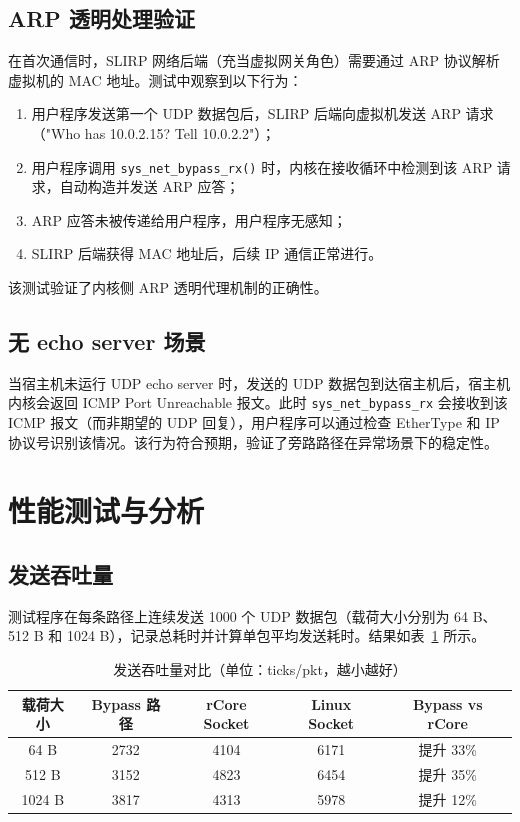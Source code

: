 \subsection{ARP 透明处理验证}

在首次通信时，SLIRP 网络后端（充当虚拟网关角色）需要通过 ARP 协议解析虚拟机的 MAC 地址。测试中观察到以下行为：

\begin{enumerate}
    \item 用户程序发送第一个 UDP 数据包后，SLIRP 后端向虚拟机发送 ARP 请求（"Who has 10.0.2.15? Tell 10.0.2.2"）；
    \item 用户程序调用 \texttt{sys\_net\_bypass\_rx()} 时，内核在接收循环中检测到该 ARP 请求，自动构造并发送 ARP 应答；
    \item ARP 应答未被传递给用户程序，用户程序无感知；
    \item SLIRP 后端获得 MAC 地址后，后续 IP 通信正常进行。
\end{enumerate}

该测试验证了内核侧 ARP 透明代理机制的正确性。

\subsection{无 echo server 场景}

当宿主机未运行 UDP echo server 时，发送的 UDP 数据包到达宿主机后，宿主机内核会返回 ICMP Port Unreachable 报文。此时 \texttt{sys\_net\_bypass\_rx} 会接收到该 ICMP 报文（而非期望的 UDP 回复），用户程序可以通过检查 EtherType 和 IP 协议号识别该情况。该行为符合预期，验证了旁路路径在异常场景下的稳定性。


\section{性能测试与分析}
\label{sec:perf}

\subsection{发送吞吐量}

测试程序在每条路径上连续发送 1000 个 UDP 数据包（载荷大小分别为 64 B、512 B 和 1024 B），记录总耗时并计算单包平均发送耗时。结果如表~\ref{tab:tx-throughput} 所示。

\begin{table}[htbp]
    \centering
    \caption{发送吞吐量对比（单位：ticks/pkt，越小越好）}
    \label{tab:tx-throughput}
    \begin{tabular}{ccccc}
        \toprule
        载荷大小 & Bypass 路径 & rCore Socket & Linux Socket & Bypass vs rCore \\
        \midrule
        64 B   & 2732  & 4104  & 6171 & 提升 33\% \\
        512 B  & 3152  & 4823  & 6454 & 提升 35\% \\
        1024 B & 3817  & 4313  & 5978 & 提升 12\% \\
        \bottomrule
    \end{tabular}
\end{table}


